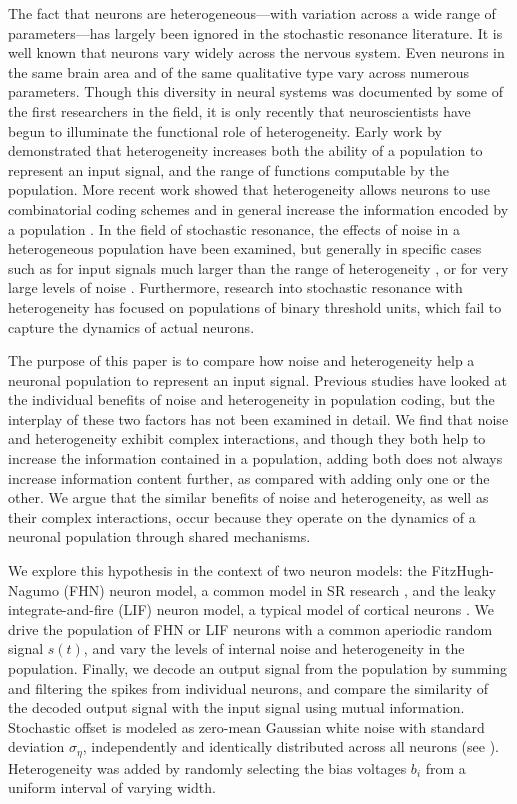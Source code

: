 \documentclass[12pt]{article}
\begin{document}
The fact that neurons are heterogeneous---with variation across a wide range of parameters---has largely been ignored in the stochastic resonance literature. It is well known that neurons vary widely across the nervous system. Even neurons in the same brain area and of the same qualitative type vary across numerous parameters. Though this diversity in neural systems was documented by some of the first researchers in the field, it is only recently that neuroscientists have begun to illuminate the functional role of heterogeneity. Early work by \cite{Eliasmith2003} demonstrated that heterogeneity increases both the ability of a population to represent an input signal, and the range of functions computable by the population. More recent work showed that heterogeneity allows neurons to use combinatorial coding schemes \citep{Osborne2008} and in general increase the information encoded by a population \citep{Shamir2006,Chelaru2008,Padmanabhan2010,Ecker2011}. In the field of stochastic resonance, the effects of noise in a heterogeneous population have been examined, but generally in specific cases such as for input signals much larger than the range of heterogeneity \citep{Stocks2000}, or for very large levels of noise \citep{McDonnell2006}. Furthermore, research into stochastic resonance with heterogeneity has focused on populations of binary threshold units, which fail to capture the dynamics of actual neurons.

The purpose of this paper is to compare how noise and heterogeneity help a neuronal population to represent an input signal. Previous studies have looked at the individual benefits of noise and heterogeneity in population coding, but the interplay of these two factors has not been examined in detail. We find that noise and heterogeneity exhibit complex interactions, and though they both help to increase the information contained in a population, adding both does not always increase information content further, as compared with adding only one or the other. We argue that the similar benefits of noise and heterogeneity, as well as their complex interactions, occur because they operate on the dynamics of a neuronal population through shared mechanisms.

We explore this hypothesis in the context of two neuron models: the FitzHugh-Nagumo (FHN) neuron model, a common model in SR research \citep{Wiesenfeld1994,Collins1995,Longtin1998,Stocks2001}, and the leaky integrate-and-fire (LIF) neuron model, a typical model of cortical neurons \citep{Koch1999}. We drive the population of FHN or LIF neurons with a common aperiodic random signal $s(t)$, and vary the levels of internal noise and heterogeneity in the population. Finally, we decode an output signal from the population by summing and filtering the spikes from individual neurons, and compare the similarity of the decoded output signal with the input signal using mutual information. Stochastic offset is modeled as zero-mean Gaussian white noise with standard deviation $\sigma_\eta$, independently and identically distributed across all neurons (see \textsc{}). Heterogeneity was added by randomly selecting the bias voltages $b_i$ from a uniform interval of varying width.
\end{document}
